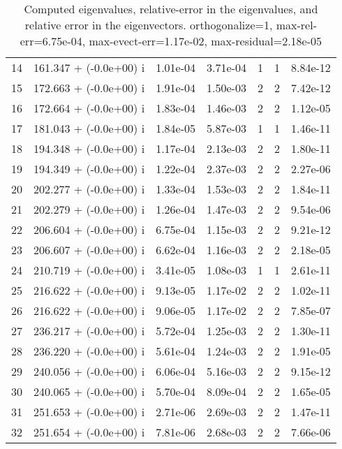 \begin{table}[H]
\begin{center}
\begin{tabular}{|c|c|c|c|c|c|c|}
    14  &    161.347 + (-0.0e+00) i  &    1.01e-04      &   3.71e-04    &   1    &  1   &    8.84e-12 \\
    15  &    172.663 + (-0.0e+00) i  &    1.91e-04      &   1.50e-03    &   2    &  2   &    7.42e-12 \\
    16  &    172.664 + (-0.0e+00) i  &    1.83e-04      &   1.46e-03    &   2    &  2   &    1.12e-05 \\
    17  &    181.043 + (-0.0e+00) i  &    1.84e-05      &   5.87e-03    &   1    &  1   &    1.46e-11 \\
    18  &    194.348 + (-0.0e+00) i  &    1.17e-04      &   2.13e-03    &   2    &  2   &    1.80e-11 \\
    19  &    194.349 + (-0.0e+00) i  &    1.22e-04      &   2.37e-03    &   2    &  2   &    2.27e-06 \\
    20  &    202.277 + (-0.0e+00) i  &    1.33e-04      &   1.53e-03    &   2    &  2   &    1.84e-11 \\
    21  &    202.279 + (-0.0e+00) i  &    1.26e-04      &   1.47e-03    &   2    &  2   &    9.54e-06 \\
    22  &    206.604 + (-0.0e+00) i  &    6.75e-04      &   1.15e-03    &   2    &  2   &    9.21e-12 \\
    23  &    206.607 + (-0.0e+00) i  &    6.62e-04      &   1.16e-03    &   2    &  2   &    2.18e-05 \\
    24  &    210.719 + (-0.0e+00) i  &    3.41e-05      &   1.08e-03    &   1    &  1   &    2.61e-11 \\
    25  &    216.622 + (-0.0e+00) i  &    9.13e-05      &   1.17e-02    &   2    &  2   &    1.02e-11 \\
    26  &    216.622 + (-0.0e+00) i  &    9.06e-05      &   1.17e-02    &   2    &  2   &    7.85e-07 \\
    27  &    236.217 + (-0.0e+00) i  &    5.72e-04      &   1.25e-03    &   2    &  2   &    1.30e-11 \\
    28  &    236.220 + (-0.0e+00) i  &    5.61e-04      &   1.24e-03    &   2    &  2   &    1.91e-05 \\
    29  &    240.056 + (-0.0e+00) i  &    6.06e-04      &   5.16e-03    &   2    &  2   &    9.15e-12 \\
    30  &    240.065 + (-0.0e+00) i  &    5.70e-04      &   8.09e-04    &   2    &  2   &    1.65e-05 \\
    31  &    251.653 + (-0.0e+00) i  &    2.71e-06      &   2.69e-03    &   2    &  2   &    1.47e-11 \\
    32  &    251.654 + (-0.0e+00) i  &    7.81e-06      &   2.68e-03    &   2    &  2   &    7.66e-06 \\
\hline
\end{tabular}
\caption{Computed eigenvalues, relative-error in the eigenvalues, and relative error in the eigenvectors. orthogonalize=1, max-rel-err=6.75e-04, max-evect-err=1.17e-02, max-residual=2.18e-05
}\label{table:genEigspipeze2.order4.ng3.hdf}
\end{center}
\end{table}
